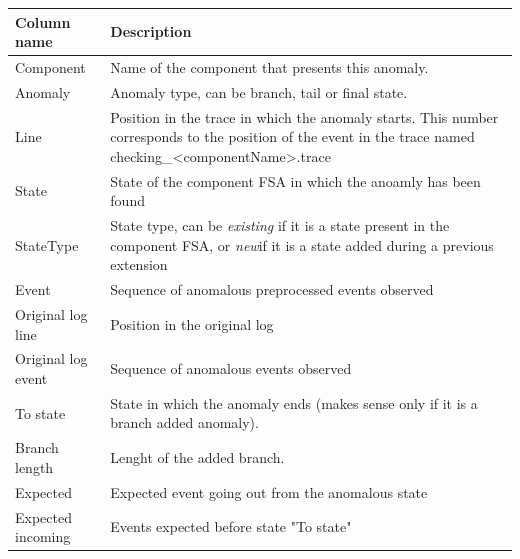 \begin{table}
\begin{tabular}{|p{6cm}|p{10cm}|}
\hline
Column name&Description\\
\hline
Component&Name of the component that presents this anomaly.\\
Anomaly&Anomaly type, can be branch, tail or final state.\\
Line&Position in the trace in which the anomaly starts. 
This number corresponds to the position of the event in the trace named
checking\_<componentName>.trace \\ 
State&State of the component FSA in which the anoamly has been found\\
StateType& State type, can be \textit{existing} if it is a state present in the 
component FSA, or \textit{new}if it is a state added during a previous extension\\
Event&Sequence of anomalous preprocessed events observed\\
Original log line&Position in the original log\\
Original log event&Sequence of anomalous events observed\\
To state&State in which the anomaly ends (makes sense only if it is a branch
added anomaly). \\
Branch length&Lenght of the added branch.\\
Expected&Expected event going out from the anomalous state\\
Expected incoming&Events expected before state "To state"\\
\hline 
\end{tabular}
\end{table}  
